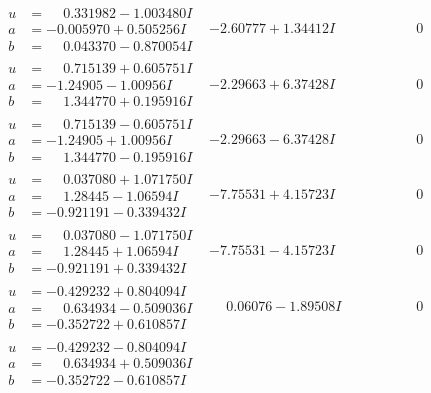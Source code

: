 \documentclass[1p]{elsarticle_modified}
\theoremstyle{definition}
\begin{document}
$$\begin{array}{c|c|c}
\begin{aligned}
u &= \phantom{-}0.331982 - 1.003480 I \\
a &= -0.005970 + 0.505256 I \\
b &= \phantom{-}0.043370 - 0.870054 I\end{aligned}
 & -2.60777 + 1.34412 I & \phantom{-0.000000 } 0 \\ \hline\begin{aligned}
u &= \phantom{-}0.715139 + 0.605751 I \\
a &= -1.24905 - 1.00956 I \\
b &= \phantom{-}1.344770 + 0.195916 I\end{aligned}
 & -2.29663 + 6.37428 I & \phantom{-0.000000 } 0 \\ \hline\begin{aligned}
u &= \phantom{-}0.715139 - 0.605751 I \\
a &= -1.24905 + 1.00956 I \\
b &= \phantom{-}1.344770 - 0.195916 I\end{aligned}
 & -2.29663 - 6.37428 I & \phantom{-0.000000 } 0 \\ \hline\begin{aligned}
u &= \phantom{-}0.037080 + 1.071750 I \\
a &= \phantom{-}1.28445 - 1.06594 I \\
b &= -0.921191 - 0.339432 I\end{aligned}
 & -7.75531 + 4.15723 I & \phantom{-0.000000 } 0 \\ \hline\begin{aligned}
u &= \phantom{-}0.037080 - 1.071750 I \\
a &= \phantom{-}1.28445 + 1.06594 I \\
b &= -0.921191 + 0.339432 I\end{aligned}
 & -7.75531 - 4.15723 I & \phantom{-0.000000 } 0 \\ \hline\begin{aligned}
u &= -0.429232 + 0.804094 I \\
a &= \phantom{-}0.634934 - 0.509036 I \\
b &= -0.352722 + 0.610857 I\end{aligned}
 & \phantom{-}0.06076 - 1.89508 I & \phantom{-0.000000 } 0 \\ \hline\begin{aligned}
u &= -0.429232 - 0.804094 I \\
a &= \phantom{-}0.634934 + 0.509036 I \\
b &= -0.352722 - 0.610857 I\end{aligned}

\end{array}$$
\end{document}
